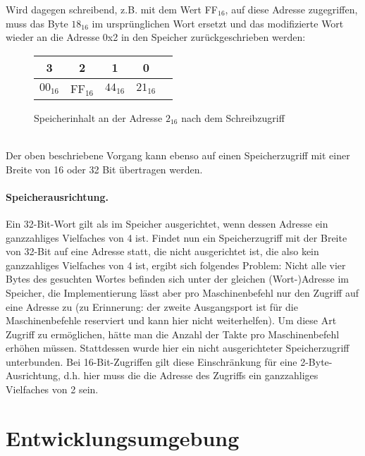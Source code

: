 Wird dagegen schreibend, z.B. mit dem Wert FF$_{16}$,  auf diese Adresse zugegriffen, muss das Byte $18_{16}$ im ursprünglichen Wort ersetzt und das modifizierte Wort wieder an die Adresse 0x2 in den Speicher zurückgeschrieben werden:
\begin{figure} [htpb]
    \centering
        \begin{tabular}{|c|c|c|c|c|}
            \multicolumn{1}{c}{3} & \multicolumn{1}{c}{2} &  \multicolumn{1}{c}{1}& \multicolumn{1}{c}{0}\\
            \hline
            $00_{16}$ & FF$_{16}$ & $44_{16}$ & $21_{16}$\\
            \hline
        \end{tabular}
        \caption{Speicherinhalt an der Adresse $2_{16}$ nach dem Schreibzugriff}
\end{figure}\\
Der oben beschriebene Vorgang kann ebenso auf einen Speicherzugriff mit einer Breite von 16 oder 32 Bit übertragen werden.

\paragraph{Speicherausrichtung.} 
Ein 32-Bit-Wort gilt als im Speicher ausgerichtet, wenn dessen Adresse ein ganzzahliges Vielfaches von 4 ist.
Findet nun ein Speicherzugriff mit der Breite von 32-Bit auf eine Adresse statt, die nicht ausgerichtet ist, die also kein ganzzahliges Vielfaches von 4 ist, ergibt sich folgendes Problem:
Nicht alle vier Bytes des gesuchten Wortes befinden sich unter der gleichen (Wort-)Adresse im Speicher, die Implementierung lässt aber pro Maschinenbefehl nur den Zugriff auf eine Adresse zu (zu Erinnerung: der zweite Ausgangsport ist für die Maschinenbefehle reserviert und kann hier nicht weiterhelfen).
Um diese Art Zugriff zu ermöglichen, hätte man die Anzahl der Takte pro Maschinenbefehl erhöhen müssen. 
Stattdessen wurde hier ein nicht ausgerichteter Speicherzugriff unterbunden.
Bei 16-Bit-Zugriffen gilt diese Einschränkung für eine 2-Byte-Ausrichtung, d.h. hier muss die die Adresse des Zugriffs ein ganzzahliges Vielfaches von 2 sein.





\section{Entwicklungsumgebung}
